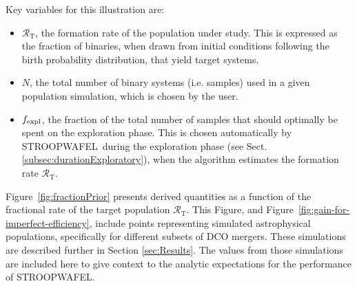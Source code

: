 \documentclass[a4paper,fleqn,usenatbib,useAMS,usedcolumn]{mnras}
\newcommand\rate{\mathcal{R}}
\newcommand{\AISs}{\textsc{STROOPWAFEL}}
\begin{document}
Key variables for this illustration are:
\begin{itemize}
\item{$\rate_{\text{T}}$, the formation rate of the population under study. This is expressed as the fraction of binaries, when drawn from initial conditions following the birth probability distribution, that yield target systems.}
\item{$N$, the total number of binary systems (i.e. samples) used in a given population simulation, which is chosen by the user.}     
\item{$f_{\rm{expl}}$, the fraction of the total number of samples that should optimally be spent on the exploration phase. This is chosen automatically by \AISs \ during the exploration phase (see Sect. \ref{subsec:durationExploratory}),  when the algorithm estimates the formation rate $\rate_{\text{T}}$.}
\end{itemize}



Figure~\ref{fig:fractionPrior} presents derived quantities as a function of the fractional rate of the target population $\rate_{\text{T}}$.  This Figure, and Figure~\ref{fig:gain-for-imperfect-efficiency}, include points representing simulated astrophysical populations, specifically for different subsets of DCO mergers. These simulations are described further in Section \ref{sec:Results}. The values from those simulations are included here to give context to the analytic expectations for the performance of \AISs{}.  
\end{document}
